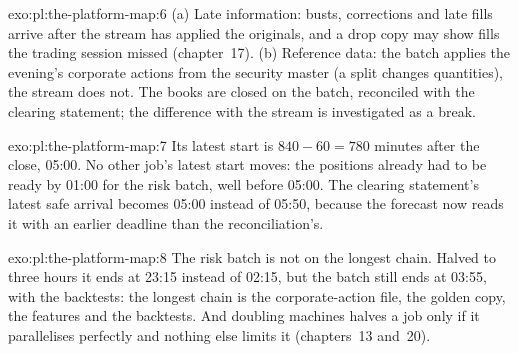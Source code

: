 \begin{solution}{exo:pl:the-platform-map:6}
(a) Late information: busts, corrections and late fills arrive after the stream has applied the originals, and a drop copy may
show fills the trading session missed (chapter~17). (b) Reference data: the batch applies the evening's corporate actions from the
security master (a split changes quantities), the stream does not. The books are closed on the batch, reconciled with the
clearing statement; the difference with the stream is investigated as a break.
\end{solution}

\begin{solution}{exo:pl:the-platform-map:7}
Its latest start is $840 - 60 = 780$ minutes after the close, 05:00. No other job's latest start moves: the positions already had
to be ready by 01:00 for the risk batch, well before 05:00. The clearing statement's latest safe arrival becomes 05:00 instead of
05:50, because the forecast now reads it with an earlier deadline than the reconciliation's.
\end{solution}

\begin{solution}{exo:pl:the-platform-map:8}
The risk batch is not on the longest chain. Halved to three hours it ends at 23:15 instead of 02:15, but the batch still ends at
03:55, with the backtests: the longest chain is the corporate-action file, the golden copy, the features and the backtests. And
doubling machines halves a job only if it parallelises perfectly and nothing else limits it (chapters~13 and~20).
\end{solution}


